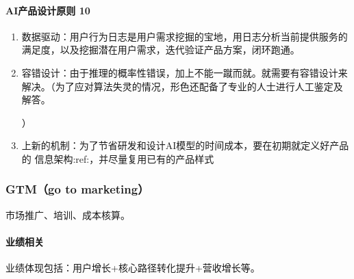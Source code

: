\documentclass[letterpaper,10pt,english]{sphinxmanual}
\begin{document}
\paragraph{AI产品设计原则 10\sphinxfootnotemark[461]}
\label{\detokenize{chapter_idea/design:ai-10}}%
\begin{footnotetext}[461]\sphinxAtStartFootnote
{}
%
\end{footnotetext}\ignorespaces \begin{enumerate}
%
\item {} 
数据驱动：用户行为日志是用户需求挖掘的宝地，用日志分析当前提供服务的满足度，以及挖掘潜在用户需求，迭代验证产品方案，闭环跑通。

\item {} 
容错设计：由于推理的概率性错误，加上不能一蹴而就。就需要有容错设计来解决。（为了应对算法失灵的情况，形色还配备了专业的人士进行人工鉴定及解答。%
\begin{footnote}[462]\sphinxAtStartFootnote
{}
%
\end{footnote}）

\item {} 
上新的机制：为了节省研发和设计AI模型的时间成本，要在初期就定义好产品的
信息架构:ref:，并尽量复用已有的产品样式

\end{enumerate}


\subsubsection{GTM（go to marketing）}
\label{\detokenize{chapter_idea/GTM:gtm-go-to-marketing}}\label{\detokenize{chapter_idea/GTM::doc}}
市场推广、培训、成本核算。


\paragraph{业绩相关}
\label{\detokenize{chapter_idea/GTM:id1}}
业绩体现包括：用户增长+核心路径转化提升+营收增长等。%
\begin{footnote}[463]\sphinxAtStartFootnote
{}
%
\end{footnote}
\end{document}
